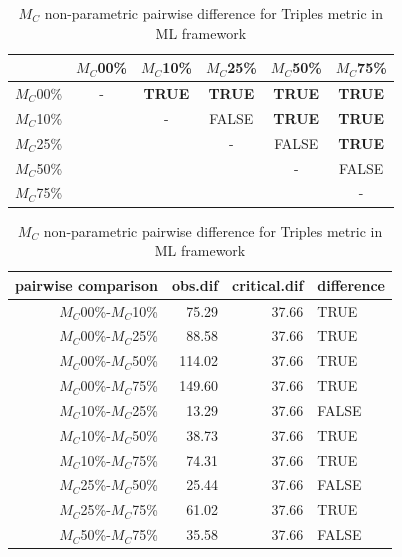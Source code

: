 \documentclass[12pt,letterpaper]{article}
\begin{document}
\begin{table}
\caption{$M_C$ non-parametric pairwise difference for Triples metric in ML framework} %
\centering
\begin{tabular}{c|ccccc}
    \hline
              & $M_C$00\% & $M_C$10\% & $M_C$25\% & $M_C$50\% & $M_C$75\% \\
    \hline
    $M_C$00\% & - & \textbf{TRUE} & \textbf{TRUE} & \textbf{TRUE} & \textbf{TRUE}\\
    $M_C$10\% & & - & FALSE & \textbf{TRUE} & \textbf{TRUE} \\
    $M_C$25\% & & & - & FALSE & \textbf{TRUE} \\
    $M_C$50\% & & & & - & FALSE \\
    $M_C$75\% & & & & & - \\
    \hline
\end{tabular}
\centering
\begin{tabular}{rrrl}
 pairwise comparison & obs.dif & critical.dif & difference \\ 
  \hline
  $M_C$00\%-$M_C$10\% & 75.29 & 37.66 & TRUE \\ 
  $M_C$00\%-$M_C$25\% & 88.58 & 37.66 & TRUE \\ 
  $M_C$00\%-$M_C$50\% & 114.02 & 37.66 & TRUE \\ 
  $M_C$00\%-$M_C$75\% & 149.60 & 37.66 & TRUE \\ 
  $M_C$10\%-$M_C$25\% & 13.29 & 37.66 & FALSE \\ 
  $M_C$10\%-$M_C$50\% & 38.73 & 37.66 & TRUE \\ 
  $M_C$10\%-$M_C$75\% & 74.31 & 37.66 & TRUE \\ 
  $M_C$25\%-$M_C$50\% & 25.44 & 37.66 & FALSE \\ 
  $M_C$25\%-$M_C$75\% & 61.02 & 37.66 & TRUE \\ 
  $M_C$50\%-$M_C$75\% & 35.58 & 37.66 & FALSE \\ 
   \hline
\end{tabular}
\label{ML_Tr-MC_results}
\end{table}
\end{document}
